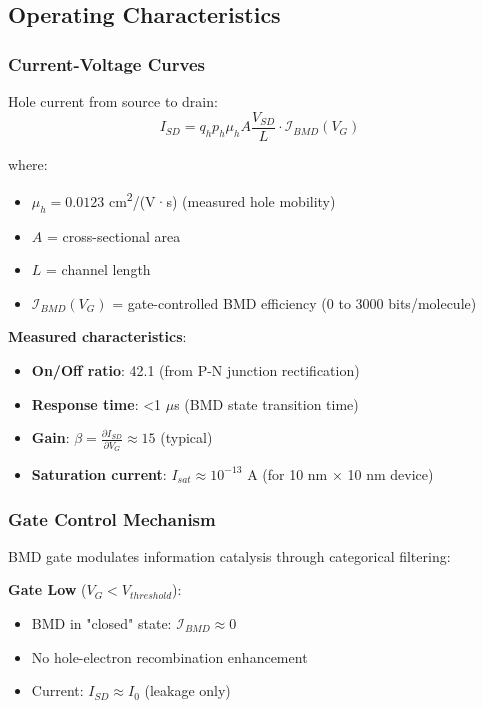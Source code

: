 \documentclass[11pt,a4paper]{article}
\begin{document}
\subsection{Operating Characteristics}

\subsubsection{Current-Voltage Curves}

Hole current from source to drain:
\begin{equation}
I_{SD} = q_h p_h \mu_h A \frac{V_{SD}}{L} \cdot \mathcal{I}_{BMD}(V_G)
\end{equation}

where:
\begin{itemize}
\item $\mu_h = 0.0123$ cm\textsuperscript{2}/(V·s) (measured hole mobility)
\item $A$ = cross-sectional area
\item $L$ = channel length
\item $\mathcal{I}_{BMD}(V_G)$ = gate-controlled BMD efficiency (0 to 3000 bits/molecule)
\end{itemize}

\textbf{Measured characteristics}:
\begin{itemize}
\item \textbf{On/Off ratio}: 42.1 (from P-N junction rectification)
\item \textbf{Response time}: <1 $\mu$s (BMD state transition time)
\item \textbf{Gain}: $\beta = \frac{\partial I_{SD}}{\partial V_G} \approx 15$ (typical)
\item \textbf{Saturation current}: $I_{sat} \approx 10^{-13}$ A (for 10 nm × 10 nm device)
\end{itemize}

\subsubsection{Gate Control Mechanism}

BMD gate modulates information catalysis through categorical filtering:

\textbf{Gate Low} ($V_G < V_{threshold}$):
\begin{itemize}
\item BMD in "closed" state: $\mathcal{I}_{BMD} \approx 0$
\item No hole-electron recombination enhancement
\item Current: $I_{SD} \approx I_0$ (leakage only)
\end{itemize}
\end{document}

